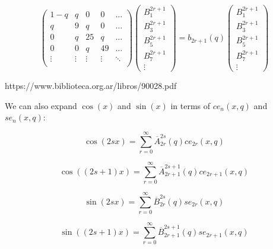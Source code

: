 \documentclass{article}
\begin{document}
\begin{equation}
    \left(
    \begin{matrix}
        1-q & q & 0 & 0 & \dots \\
        q & 9 & q & 0 & \dots \\
        0 & q & 25 & q & \dots \\
        0 & 0 & q & 49 & \dots \\
        \vdots & \vdots & \vdots & \vdots & \ddots \\

    \end{matrix}
    \right)
    \left(
    \begin{matrix}
        B_1^{2r+1} \\
        B_3^{2r+1}\\
        B_5^{2r+1}\\
        B_7^{2r+1}\\
        \vdots
    \end{matrix}
    \right)
    = b_{2r+1}(q)
    \left(
        \begin{matrix}
            B_1^{2r+1} \\
            B_3^{2r+1}\\
            B_5^{2r+1}\\
            B_7^{2r+1}\\
            \vdots
        \end{matrix}
    \right)
\end{equation}

https://www.biblioteca.org.ar/libros/90028.pdf

We can also expand $\cos(x)$ and $\sin(x)$ in terms of $ce_n(x, q)$ and $se_n(x, q)$:

\begin{equation}
    \cos(2sx) = \sum_{r=0}^\infty \overline{A}_{2r}^{2s}(q)ce_{2r}(x,q)  
\end{equation}

\begin{equation}
    \cos((2s+1)x) = \sum_{r=0}^\infty \overline{A}_{2r+1}^{2s+1}(q)ce_{2r+1}(x,q)  
\end{equation}

\begin{equation}
    \sin(2sx) = \sum_{r=0}^\infty \overline{B}_{2r}^{2s}(q)se_{2r}(x,q)  
\end{equation}

\begin{equation}
    \sin((2s+1)x) = \sum_{r=0}^\infty \overline{B}_{2r+1}^{2s+1}(q)se_{2r+1}(x,q)  
\end{equation}
\end{document}
